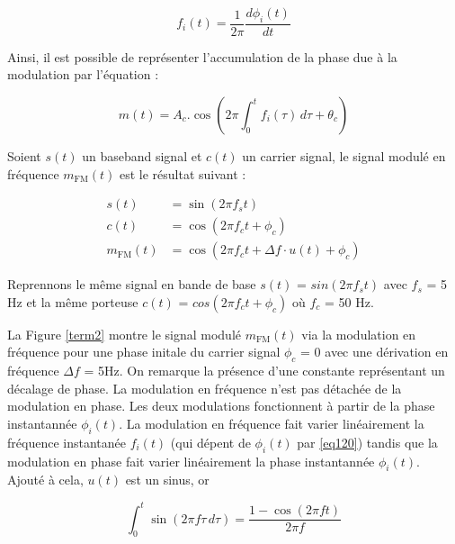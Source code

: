 \begin{equation}\label{eq120}
f_i(t) = \frac{1}{2\pi} \frac{d\phi_i(t)}{dt}
\end{equation}

Ainsi, il est possible de représenter l'accumulation de la phase due à la modulation par l'équation :

\begin{equation}\label{eq121}
m(t) = A_c.\cos(2 \pi \int_{0}^{t} f_i(\tau) \, d\tau +  \theta_c)
\end{equation}

\vspace{0.1cm}

Soient $s(t)$ un baseband signal et $c(t)$ un carrier signal, le signal modulé en fréquence $m_\mathrm{FM}(t)$ est le résultat suivant :

\begin{align}
    s(t) &= \sin(2\pi f_{s}t) \\
    c(t) &= \cos(2\pi f_{c}t + \phi_{c}) \\
    m_\mathrm{FM}(t) &= \cos\left(2\pi f_{c}t + \Delta f \cdot u(t) + \phi_{c}\right)
\end{align}

\vspace{0.1cm}

Reprennons le même signal en bande de base 
$s(t)$ = $sin(2\pi f_{s}t)$ avec $f_{s}$ = 5 Hz et la même porteuse 
$c(t)$ = $cos(2\pi f_{c}t + \phi_{c})$ où $f_{c}$ = 50 Hz.

\vspace{0.1cm}

La Figure \ref{term2} montre le signal modulé $m_\mathrm{FM}(t)$ via la modulation en fréquence pour une phase initale du carrier signal $\phi_{c}$ = 0 avec une dérivation en fréquence $\Delta f$ = 5Hz. On remarque la présence d'une constante représentant un décalage de phase. La modulation en fréquence n'est pas détachée de la modulation en phase. Les deux modulations fonctionnent à partir de la phase instantannée $\phi_i(t)$. La modulation en fréquence fait varier linéairement la fréquence instantanée $f_i(t)$ (qui dépent de $\phi_i(t)$ par \ref{eq120}) tandis que la modulation en phase fait varier linéairement la phase instantannée $\phi_i(t)$. Ajouté à cela, $u(t)$ est un sinus, or 

\begin{equation}\label{eq122}
\int_{0}^{t} \sin(2 \pi f \tau \, d\tau) = \frac{1 - \cos(2\pi f t)}{2 \pi f}
\end{equation}

